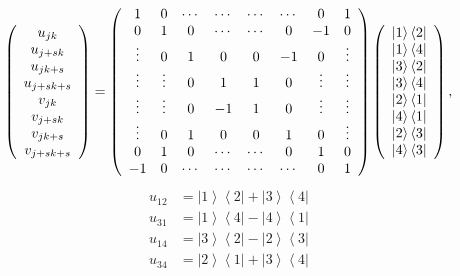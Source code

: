 \documentclass[aps,preprint]{revtex4}%
\begin{document}
\begin{equation}
\left(
\begin{array}
[c]{c}%
u_{jk}\\
u_{j+sk}\\
u_{jk+s}\\
u_{j+sk+s}\\
v_{jk}\\
v_{j+sk}\\
v_{jk+s}\\
v_{j+sk+s}%
\end{array}
\right)  =\left(
\begin{array}
[c]{cccccccc}%
1 & 0 & \cdots & \cdots & \cdots & \cdots & 0 & 1\\
0 & 1 & 0 & \cdots & \cdots & 0 & -1 & 0\\
\vdots & 0 & 1 & 0 & 0 & -1 & 0 & \vdots\\
\vdots & \vdots & 0 & 1 & 1 & 0 & \vdots & \vdots\\
\vdots & \vdots & 0 & -1 & 1 & 0 & \vdots & \vdots\\
\vdots & 0 & 1 & 0 & 0 & 1 & 0 & \vdots\\
0 & 1 & 0 & \cdots & \cdots & 0 & 1 & 0\\
-1 & 0 & \cdots & \cdots & \cdots & \cdots & 0 & 1
\end{array}
\right)  \left(
\begin{array}
[c]{c}%
\left\vert 1\right\rangle \left\langle 2\right\vert \\
\left\vert 1\right\rangle \left\langle 4\right\vert \\
\left\vert 3\right\rangle \left\langle 2\right\vert \\
\left\vert 3\right\rangle \left\langle 4\right\vert \\
\left\vert 2\right\rangle \left\langle 1\right\vert \\
\left\vert 4\right\rangle \left\langle 1\right\vert \\
\left\vert 2\right\rangle \left\langle 3\right\vert \\
\left\vert 4\right\rangle \left\langle 3\right\vert
\end{array}
\right)  ,
\end{equation}%
\begin{align*}
u_{12}  & =\left\vert 1\right\rangle \left\langle 2\right\vert +\left\vert
3\right\rangle \left\langle 4\right\vert \\
u_{31}  & =\left\vert 1\right\rangle \left\langle 4\right\vert -\left\vert
4\right\rangle \left\langle 1\right\vert \\
u_{14}  & =\left\vert 3\right\rangle \left\langle 2\right\vert -\left\vert
2\right\rangle \left\langle 3\right\vert \\
u_{34}  & =\left\vert 2\right\rangle \left\langle 1\right\vert +\left\vert
3\right\rangle \left\langle 4\right\vert
\end{align*}%
\end{document}
